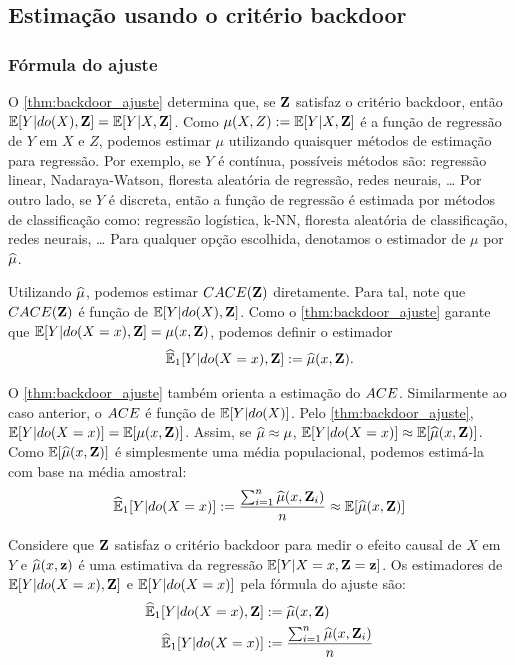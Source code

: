 \subsection{Estimação usando o critério backdoor}
\label{sec:backdoor_est}

\subsubsection{Fórmula do ajuste}

O \cref{thm:backdoor_ajuste} determina que, 
se ${\mathbf{Z}}$ satisfaz o critério backdoor, então
${\mathbb E}[Y|do(X),{\mathbf{Z}}] = {\mathbb E}[Y|X,{\mathbf{Z}}]$.
Como $\mu(X,Z) := {\mathbb E}[Y|X,{\mathbf{Z}}]$ é 
a função de regressão de $Y$ em $X$ e $Z$,
podemos estimar $\mu$ utilizando 
quaisquer métodos de estimação para regressão.
Por exemplo, se $Y$ é contínua,
possíveis métodos são:
regressão linear, Nadaraya-Watson, 
floresta aleatória de regressão, redes neurais, \ldots
Por outro lado, se $Y$ é discreta,
então a função de regressão é estimada por
métodos de classificação como:
regressão logística, k-NN, 
floresta aleatória de classificação,
redes neurais, \ldots
Para qualquer opção escolhida,
denotamos o estimador de $\mu$ por ${\widehat{\mu}}$.

Utilizando ${\widehat{\mu}}$, podemos estimar
${CACE}({\mathbf{Z}})$ diretamente.
Para tal, note que ${CACE}({\mathbf{Z}})$ é
função de ${\mathbb E}[Y|do(X),{\mathbf{Z}}]$.
Como o \cref{thm:backdoor_ajuste} garante que
${\mathbb E}[Y|do(X=x),{\mathbf{Z}}] = \mu(x,{\mathbf{Z}})$,
podemos definir o estimador
\begin{align*}
 {\widehat{{\mathbb E}}}_{1}[Y|do(X=x),{\mathbf{Z}}] := {\widehat{\mu}}(x,{\mathbf{Z}}).
\end{align*}

O \cref{thm:backdoor_ajuste} também 
orienta a estimação do ${ACE}$. 
Similarmente ao caso anterior,
o ${ACE}$ é função de ${\mathbb E}[Y|do(X)]$.
Pelo \cref{thm:backdoor_ajuste},
${\mathbb E}[Y|do(X=x)] = {\mathbb E}[\mu(x,{\mathbf{Z}})]$.
Assim, se ${\widehat{\mu}} \approx \mu$,
${\mathbb E}[Y|do(X=x)] \approx {\mathbb E}[{\widehat{\mu}}(x,{\mathbf{Z}})]$.
Como ${\mathbb E}[{\widehat{\mu}}(x,{\mathbf{Z}})]$ é simplesmente 
uma média populacional,
podemos estimá-la com base
na média amostral:
\begin{align*}
 {\widehat{{\mathbb E}}}_{1}[Y|do(X=x)] := \frac{\sum_{i=1}^n {\widehat{\mu}}(x,{\mathbf{Z}}_i)}{n} \approx {\mathbb E}[{\widehat{\mu}}(x,{\mathbf{Z}})]
\end{align*}

\begin{definition}
 \label{def:ajuste}
 Considere que ${\mathbf{Z}}$ satisfaz o critério backdoor para
 medir o efeito causal de $X$ em $Y$ e
 ${\widehat{\mu}}(x,{\mathbf{z}})$ é uma estimativa 
 da regressão ${\mathbb E}[Y|X=x,{\mathbf{Z}}={\mathbf{z}}]$.
 Os estimadores de 
 ${\mathbb E}[Y|do(X=x),{\mathbf{Z}}]$ e
 ${\mathbb E}[Y|do(X=x)]$ pela
 fórmula do ajuste são:
\begin{align*}
 {\widehat{{\mathbb E}}}_{1}[Y|do(X=x),{\mathbf{Z}}] &:= {\widehat{\mu}}(x,{\mathbf{Z}}) \\
 {\widehat{{\mathbb E}}}_{1}[Y|do(X=x)] &:= \frac{\sum_{i=1}^n {\widehat{\mu}}(x,{\mathbf{Z}}_i)}{n}
\end{align*}
\end{definition}

